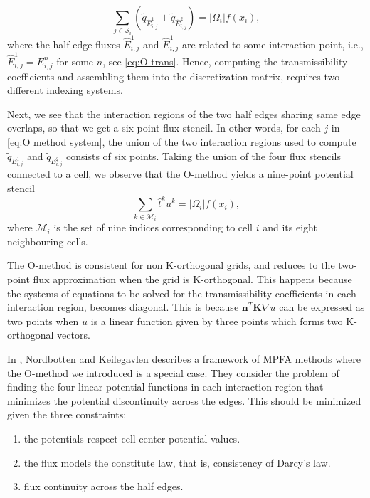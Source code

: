 \documentclass[../Main/main.tex]{subfiles}
\begin{document}
	\begin{equation}\label{eq:O method system}
			\sum_{j\in \mathcal{S}_i} (\tilde{q}_{\hat{E}_{i,j}^1} + \tilde{q}_{\hat{E}_{i,j}^2}) = |\Omega_i|f(x_i),
	\end{equation}
	where the half edge fluxes $\hat{E}_{i,j}^1$ and $\hat{E}_{i,j}^1$ are related to some interaction point, i.e., $\hat{E}_{i,j}^1=E_{i,j}^n$ for some $n$, see \eqref{eq:O trans}. Hence, computing the transmissibility coefficients and assembling them into the discretization matrix, requires two different indexing systems.\par
	Next, we see that the interaction regions of the two half edges sharing same edge overlaps, so that we get a six point flux stencil. In other words, for each $j$ in \eqref{eq:O method system}, the union of the two interaction regions used to compute $\tilde{q}_{E_{i,j}^1}$ and $\tilde{q}_{E_{i,j}^2}$ consists of six points.
	Taking the union of the four flux stencils connected to a cell, we observe that the O-method yields a nine-point potential stencil
	\begin{equation*}
		\sum_{k\in\mathcal{M}_i} \hat{t}^{k}u^k = |\Omega_i|f(x_i),
	\end{equation*}
	where $\mathcal{M}_i$ is the set of nine indices corresponding to cell $i$ and its eight neighbouring cells.\par
	The O-method is consistent for non K-orthogonal grids, and reduces to the two-point flux approximation when the grid is K-orthogonal. This happens because the systems of equations to be solved for the transmissibility coefficients in each interaction region, becomes diagonal. This is because $\bm{n}^T \bm{K} \nabla u$ can be expressed as two points when $u$ is a linear function given by three points which forms two K-orthogonal vectors.
	\par
	In \cite{nordbotten2020introduction}, Nordbotten and Keilegavlen describes a framework of MPFA methods where the O-method we introduced is a special case. They consider the problem of finding the four linear potential functions in each interaction region that minimizes the potential discontinuity across the edges. This should be minimized given the three constraints:
	\begin{enumerate}
		\item the potentials respect cell center potential values.
		\item the flux models the constitute law, that is, consistency of Darcy's law.
		\item flux continuity across the half edges.
	\end{enumerate} 
\end{document}

